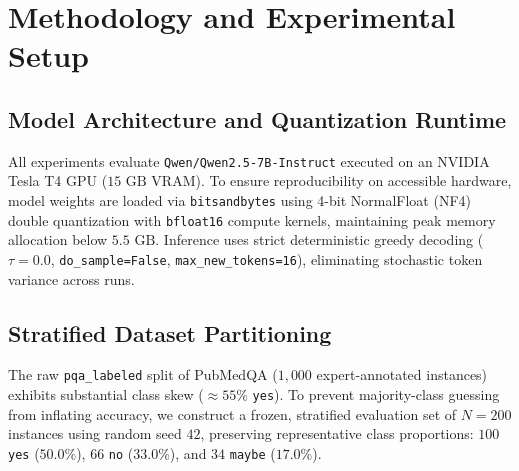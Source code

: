 \documentclass[10pt,twocolumn,letterpaper]{article}
\begin{document}
\section{Methodology and Experimental Setup}
\subsection{Model Architecture and Quantization Runtime}
All experiments evaluate \texttt{Qwen/Qwen2.5-7B-Instruct} executed on an NVIDIA Tesla T4 GPU ($15\text{ GB}$ VRAM). To ensure reproducibility on accessible hardware, model weights are loaded via \texttt{bitsandbytes} using 4-bit NormalFloat (NF4) double quantization with \texttt{bfloat16} compute kernels, maintaining peak memory allocation below $5.5\text{ GB}$. Inference uses strict deterministic greedy decoding ($\tau = 0.0$, \texttt{do\_sample=False}, \texttt{max\_new\_tokens=16}), eliminating stochastic token variance across runs.

\subsection{Stratified Dataset Partitioning}
The raw \texttt{pqa\_labeled} split of PubMedQA ($1,000$ expert-annotated instances) exhibits substantial class skew ($\approx 55\%$ \texttt{yes}). To prevent majority-class guessing from inflating accuracy, we construct a frozen, stratified evaluation set of $N = 200$ instances using random seed $42$, preserving representative class proportions: $100$ \texttt{yes} ($50.0\%$), $66$ \texttt{no} ($33.0\%$), and $34$ \texttt{maybe} ($17.0\%$).
\end{document}
